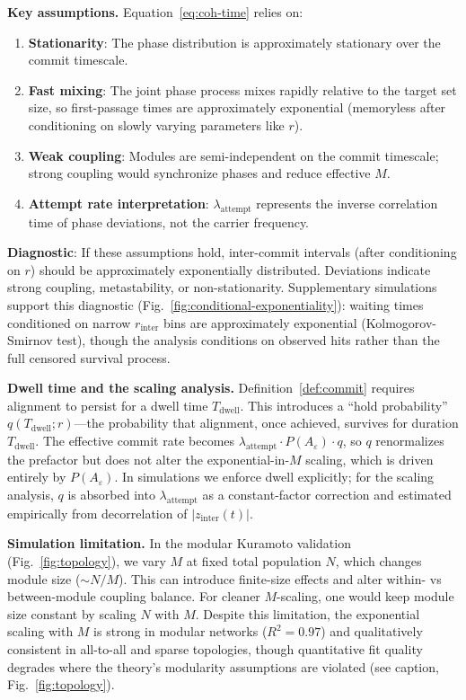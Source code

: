 \documentclass[12pt]{article}
\begin{document}
\textbf{Key assumptions.} Equation~\ref{eq:coh-time} relies on:
\begin{enumerate}
\item \textbf{Stationarity}: The phase distribution is approximately stationary over the commit timescale.
\item \textbf{Fast mixing}: The joint phase process mixes rapidly relative to the target set size, so first-passage times are approximately exponential (memoryless after conditioning on slowly varying parameters like $r$).
\item \textbf{Weak coupling}: Modules are semi-independent on the commit timescale; strong coupling would synchronize phases and reduce effective $M$.
\item \textbf{Attempt rate interpretation}: $\lambda_{\mathrm{attempt}}$ represents the inverse correlation time of phase deviations, not the carrier frequency.
\end{enumerate}
\textbf{Diagnostic}: If these assumptions hold, inter-commit intervals (after conditioning on $r$) should be approximately exponentially distributed. Deviations indicate strong coupling, metastability, or non-stationarity. Supplementary simulations support this diagnostic (Fig.~\ref{fig:conditional-exponentiality}): waiting times conditioned on narrow $r_{\mathrm{inter}}$ bins are approximately exponential (Kolmogorov-Smirnov test), though the analysis conditions on observed hits rather than the full censored survival process.

\textbf{Dwell time and the scaling analysis.} Definition~\ref{def:commit} requires alignment to persist for a dwell time $T_{\mathrm{dwell}}$. This introduces a ``hold probability'' $q(T_{\mathrm{dwell}}; r)$---the probability that alignment, once achieved, survives for duration $T_{\mathrm{dwell}}$. The effective commit rate becomes $\lambda_{\mathrm{attempt}} \cdot P(A_\varepsilon) \cdot q$, so $q$ renormalizes the prefactor but does not alter the exponential-in-$M$ scaling, which is driven entirely by $P(A_\varepsilon)$. In simulations we enforce dwell explicitly; for the scaling analysis, $q$ is absorbed into $\lambda_{\mathrm{attempt}}$ as a constant-factor correction and estimated empirically from decorrelation of $|z_{\mathrm{inter}}(t)|$.

\textbf{Simulation limitation.} In the modular Kuramoto validation (Fig.~\ref{fig:topology}), we vary $M$ at fixed total population $N$, which changes module size ($\sim N/M$). This can introduce finite-size effects and alter within- vs between-module coupling balance. For cleaner $M$-scaling, one would keep module size constant by scaling $N$ with $M$. Despite this limitation, the exponential scaling with $M$ is strong in modular networks ($R^2=0.97$) and qualitatively consistent in all-to-all and sparse topologies, though quantitative fit quality degrades where the theory's modularity assumptions are violated (see caption, Fig.~\ref{fig:topology}).
\end{document}
